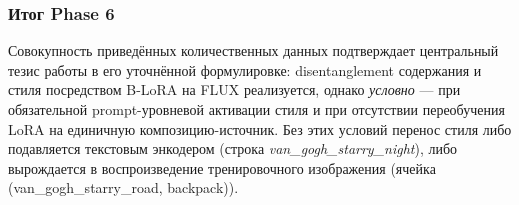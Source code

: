 \subsubsection*{Итог Phase 6}

Совокупность приведённых количественных данных подтверждает центральный тезис работы в его уточнённой формулировке: disentanglement содержания и стиля посредством B-LoRA на FLUX реализуется, однако \emph{условно} --- при обязательной prompt-уровневой активации стиля и при отсутствии переобучения LoRA на единичную композицию-источник. Без этих условий перенос стиля либо подавляется текстовым энкодером (строка \textit{van\_gogh\_starry\_night}), либо вырождается в воспроизведение тренировочного изображения (ячейка (van\_gogh\_starry\_road, backpack)).
